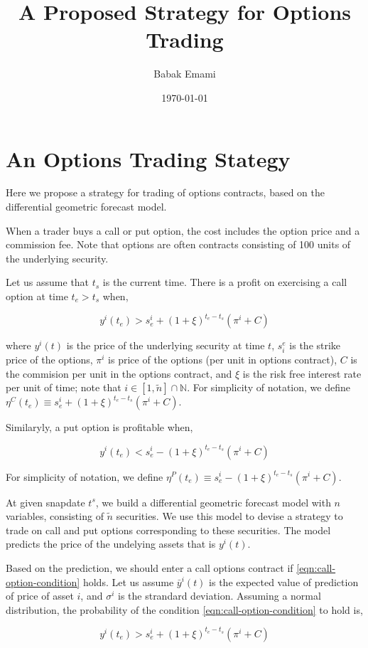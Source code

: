 \documentclass{article}
\title{A Proposed Strategy for Options Trading}
\author{Babak Emami}
\date{\today}
\begin{document}
\maketitle

\section{An Options Trading Stategy}\label{section:options_trading}

Here we propose a strategy for trading of options contracts, based on
the differential geometric forecast model.

When a trader buys a call or put option, the cost includes the option
price and a commission fee. Note that options are often contracts
consisting of 100 units of the underlying security. 

Let us assume that $t_{s}$ is the current time. There is a profit on
exercising a call option at time $t_{e} > t_{s}$ when,

\begin{equation}\label{eqn:call-option-condition}
y^{i}(t_{e}) > s_{e}^{i} + ( 1 + \xi )^{t_{e}-t_{s}} ( \pi^{i} + C )
\end{equation}

where $y^{i}(t)$ is the price of the underlying security at time $t$,
$s^{e}_{i}$ is the strike price of the options, $\pi^{i}$ is price of
the options (per unit in options contract), $C$ is the commision per
unit in the options contract, and $\xi$ is the risk free interest rate
per unit of time; note that $i \in [1,\tilde{n}] \cap \mathbb{N}$. For
simplicity of notation, we define $\eta^{C}(t_{e}) \equiv s_{e}^{i} +
( 1 + \xi )^{t_{e}-t_{s}} ( \pi^{i} + C )$.

Similaryly, a put option is profitable when,

\begin{equation}\label{eqn:put-option-condition}
y^{i}(t_{e}) < s_{e}^{i} - ( 1 + \xi )^{t_{e}-t_{s}} ( \pi^{i} + C )
\end{equation}

For simplicity of notation, we define $\eta^{P}(t_{e}) \equiv
s_{e}^{i} - ( 1 + \xi )^{t_{e}-t_{s}} ( \pi^{i} + C )$.

At given snapdate $t^{s}$, we build a differential geometric forecast
model with $n$ variables, consisting of $\tilde{n}$ securities. We use
this model to devise a strategy to trade on call and put options
corresponding to these securities. The model predicts the price of the
undelying assets that is $y^{i}(t)$.

Based on the prediction, we should enter a call options contract if
\ref{eqn:call-option-condition} holds. Let us assume $\bar{y}^{i}(t)$
is the expected value of prediction of price of asset $i$, and
$\sigma^{i}$ is the strandard deviation. Assuming a normal
distribution, the probability of the condition
\ref{eqn:call-option-condition} to hold is,

\begin{equation}\label{eqn:call-option-condition}
y^{i}(t_{e}) > s_{e}^{i} + ( 1 + \xi )^{t_{e}-t_{s}} ( \pi^{i} + C )
\end{equation}
\end{document}
